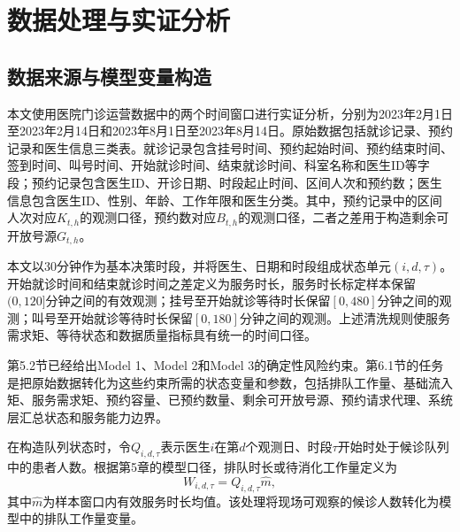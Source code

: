 \documentclass[a4paper,zihao=-4]{ctexart}
\numberwithin{figure}{section}
\numberwithin{table}{section}
\begin{document}
\section{数据处理与实证分析}

\subsection{数据来源与模型变量构造}

本文使用医院门诊运营数据中的两个时间窗口进行实证分析，分别为2023年2月1日至2023年2月14日和2023年8月1日至2023年8月14日。原始数据包括就诊记录、预约记录和医生信息三类表。就诊记录包含挂号时间、预约起始时间、预约结束时间、签到时间、叫号时间、开始就诊时间、结束就诊时间、科室名称和医生ID等字段；预约记录包含医生ID、开诊日期、时段起止时间、区间人次和预约数；医生信息包含医生ID、性别、年龄、工作年限和医生分类。其中，预约记录中的区间人次对应$K_{t,h}$的观测口径，预约数对应$B_{t,h}$的观测口径，二者之差用于构造剩余可开放号源$G_{t,h}$。

本文以30分钟作为基本决策时段，并将医生、日期和时段组成状态单元$(i,d,\tau)$。开始就诊时间和结束就诊时间之差定义为服务时长，服务时长标定样本保留$(0,120]$分钟之间的有效观测；挂号至开始就诊等待时长保留$[0,480]$分钟之间的观测；叫号至开始就诊等待时长保留$[0,180]$分钟之间的观测。上述清洗规则使服务需求矩、等待状态和数据质量指标具有统一的时间口径。

第5.2节已经给出Model 1、Model 2和Model 3的确定性风险约束。第6.1节的任务是把原始数据转化为这些约束所需的状态变量和参数，包括排队工作量、基础流入矩、服务需求矩、预约容量、已预约数量、剩余可开放号源、预约请求代理、系统层汇总状态和服务能力边界。

在构造队列状态时，令$Q_{i,d,\tau}$表示医生$i$在第$d$个观测日、时段$\tau$开始时处于候诊队列中的患者人数。根据第5章的模型口径，排队时长或待消化工作量定义为
\begin{equation}
W_{i,d,\tau}=Q_{i,d,\tau}\hat m,
\label{eq:empirical-workload}
\end{equation}
其中$\hat m$为样本窗口内有效服务时长均值。该处理将现场可观察的候诊人数转化为模型中的排队工作量变量。
\end{document}
